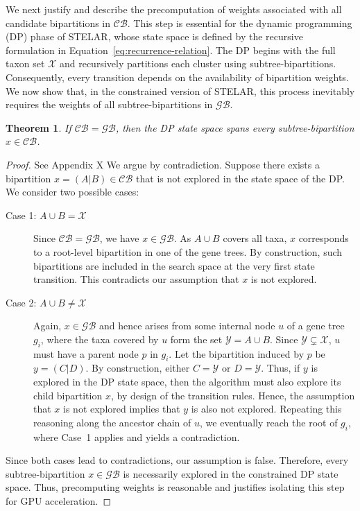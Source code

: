 \documentclass[10pt,a4paper]{article}
\newtheorem{theorem}{Theorem}[section]
\newcommand{\addb}[1]{{\color{red} #1}}
\newcommand{\addr}[1]{{\color{red} #1}}
\begin{document}
We next justify and describe the precomputation of weights associated with all candidate bipartitions in $\mathcal{CB}$. This step is essential for the dynamic programming (DP) phase of STELAR, whose state space is defined by the recursive formulation in Equation~\eqref{eq:recurrence-relation}. %
The DP begins with the full taxon set $\mathcal{X}$ and recursively partitions each cluster using subtree-bipartitions. Consequently, every transition depends on the availability of bipartition weights.  We now show that, in the constrained version of STELAR, this process inevitably requires the weights of all subtree-bipartitions in $\mathcal{GB}$.

\begin{theorem}
\label{th:dp-span}
If $\mathcal{CB} = \mathcal{GB}$, then the DP state space spans every subtree-bipartition $x \in \mathcal{CB}$.
\end{theorem}

\begin{proof}
    \addb{See Appendix X}
    We argue by contradiction. Suppose there exists a bipartition $x = (A|B) \in \mathcal{CB}$ that is not explored in the state space of the DP. We consider two possible cases:

    \begin{description}
        \item[Case 1: $A \cup B = \mathcal{X}$]  
        Since $\mathcal{CB} = \mathcal{GB}$, we have $x \in \mathcal{GB}$. As $A \cup B$ covers all taxa, $x$ corresponds to a root-level bipartition in one of the gene trees. By construction, such bipartitions are included in the search space at the very first state transition. This contradicts our assumption that $x$ is not explored.

        \item[Case 2: $A \cup B \neq \mathcal{X}$]  
        Again, $x \in \mathcal{GB}$ and hence arises from some internal node $u$ of a gene tree $g_i$, where the taxa covered by $u$ form the set $\mathcal{Y} = A \cup B$. Since $\mathcal{Y} \subsetneq \mathcal{X}$, $u$ must have a parent node $p$ in $g_i$. Let the bipartition induced by $p$ be $y = (C|D)$. By construction, either $C = \mathcal{Y}$ or $D = \mathcal{Y}$. Thus, if $y$ is explored in the DP state space, then the algorithm must also explore its child bipartition $x$, by design of the transition rules. Hence, the assumption that $x$ is not explored implies that $y$ is also not explored. Repeating this reasoning along the ancestor chain of $u$, we eventually reach the root of $g_i$, where Case~1 applies and yields a contradiction.
    \end{description}

    Since both cases lead to contradictions, our assumption is false. Therefore, every subtree-bipartition $x \in \mathcal{GB}$ is necessarily explored in the constrained DP state space. Thus, precomputing weights is reasonable and justifies isolating this step for GPU acceleration.
\end{proof}
\end{document}
